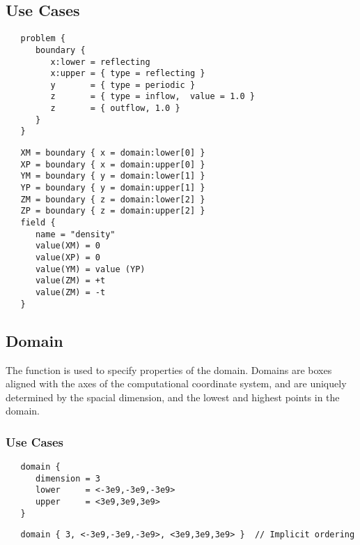 \subsection{Use Cases}

\begin{verbatim}
   problem {
      boundary {
         x:lower = reflecting
         x:upper = { type = reflecting }
         y       = { type = periodic }
         z       = { type = inflow,  value = 1.0 }
         z       = { outflow, 1.0 }
      }
   }
\end{verbatim}

\begin{verbatim}
   XM = boundary { x = domain:lower[0] }
   XP = boundary { x = domain:upper[0] }
   YM = boundary { y = domain:lower[1] }
   YP = boundary { y = domain:upper[1] }
   ZM = boundary { z = domain:lower[2] }
   ZP = boundary { z = domain:upper[2] }
   field {
      name = "density"
      value(XM) = 0
      value(XP) = 0
      value(YM) = value (YP)
      value(ZM) = +t
      value(ZM) = -t
   }
\end{verbatim}

\subsection{Domain} \label{ss:component-domain}

The  function is used to specify properties of the
domain.  Domains are boxes aligned with the axes of the computational
coordinate system, and are uniquely determined by the spacial
dimension, and the lowest and highest points in the domain.

\subsubsection{Use Cases}

\begin{verbatim}
   domain { 
      dimension = 3
      lower     = <-3e9,-3e9,-3e9>
      upper     = <3e9,3e9,3e9>
   }
\end{verbatim}

\begin{verbatim}
   domain { 3, <-3e9,-3e9,-3e9>, <3e9,3e9,3e9> }  // Implicit ordering
\end{verbatim}

